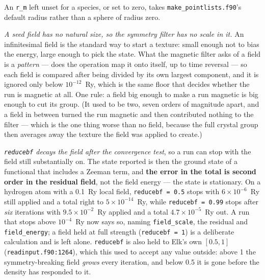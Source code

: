 \documentclass[11pt,a4paper]{article}
\newcommand{\code}[1]{\texttt{\small #1}}
\begin{document}
An \code{r\_m} left unset for a species, or set to
zero, takes \code{make\_pointlists.f90}'s default radius rather than a sphere of
radius zero.

\emph{A seed field has no natural size, so the symmetry filter has no scale in
it.} An infinitesimal field is the standard way to start a texture: small enough
not to bias the energy, large enough to pick the state. What the magnetic filter
asks of a field is a \emph{pattern} --- does the operation map it onto itself,
up to time reversal --- so each field is compared after being divided by its own
largest component, and it is ignored only below $10^{-12}$~Ry, which is the same
floor that decides whether the run is magnetic at all. One rule: a field big
enough to make a run magnetic is big enough to cut its group. (It used to be two,
seven orders of magnitude apart, and a field in between turned the run magnetic
and then contributed nothing to the filter --- which is the one thing worse than
no field, because the full crystal group then averages away the texture the field
was applied to create.)

\emph{\code{reducebf} decays the field after the convergence test}, so a run can
stop with the field still substantially on. The state reported is then the ground
state of a functional that includes a Zeeman term, and \textbf{the error in the
total is second order in the residual field}, not the field energy --- the state
is stationary. On a hydrogen atom with a 0.1~Ry local field, \code{reducebf =
0.5} stops with $6\times10^{-6}$~Ry still applied and a total right to
$5\times10^{-14}$~Ry, while \code{reducebf = 0.99} stops after \emph{six}
iterations with $9.5\times10^{-2}$~Ry applied and a total $4.7\times10^{-5}$~Ry
out. A run that stops above $10^{-4}$~Ry now says so, naming
\code{field\_scale}, the residual and \code{field\_energy}; a field held at full
strength (\code{reducebf = 1}) is a deliberate calculation and is left alone.
\code{reducebf} is also held to Elk's own $[0.5, 1]$
(\code{readinput.f90:1264}), which this used to accept any value outside:
above 1 the symmetry-breaking field \emph{grows} every iteration, and below 0.5
it is gone before the density has responded to it.
\end{document}

